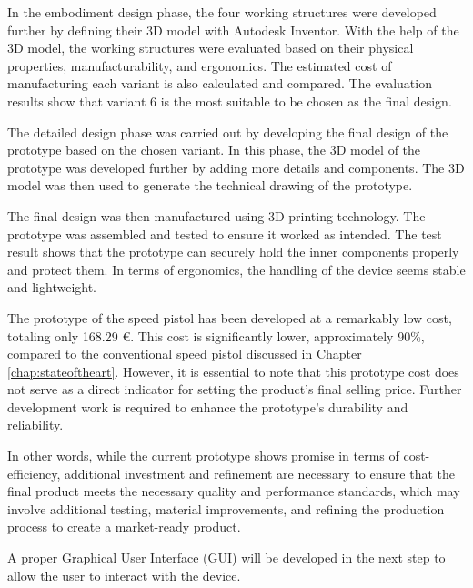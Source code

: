 In the embodiment design phase, the four working structures were developed further by defining their 3D model with Autodesk Inventor. With the help of the 3D model, the working structures were evaluated based on their physical properties, manufacturability, and ergonomics. The estimated cost of manufacturing each variant is also calculated and compared. The evaluation results show that variant 6 is the most suitable to be chosen as the final design.

The detailed design phase was carried out by developing the final design of the prototype based on the chosen variant. In this phase, the 3D model of the prototype was developed further by adding more details and components. The 3D model was then used to generate the technical drawing of the prototype.

The final design was then manufactured using 3D printing technology. The prototype was assembled and tested to ensure it worked as intended. The test result shows that the prototype can securely hold the inner components properly and protect them. In terms of ergonomics, the handling of the device seems stable and lightweight.

The prototype of the speed pistol has been developed at a remarkably low cost, totaling only 168.29 €. This cost is significantly lower, approximately 90\%, compared to the conventional speed pistol discussed in Chapter \ref{chap:stateoftheart}. However, it is essential to note that this prototype cost does not serve as a direct indicator for setting the product's final selling price. Further development work is required to enhance the prototype's durability and reliability.

In other words, while the current prototype shows promise in terms of cost-efficiency, additional investment and refinement are necessary to ensure that the final product meets the necessary quality and performance standards, which may involve additional testing, material improvements, and refining the production process to create a market-ready product.

A proper Graphical User Interface (GUI) will be developed in the next step to allow the user to interact with the device.
